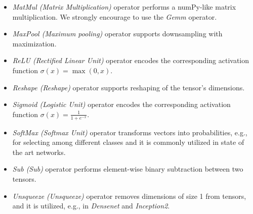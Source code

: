 \begin{itemize}
	\item \emph{MatMul (Matrix Multiplication)} operator performs a
		numPy-like matrix multiplication. We strongly encourage to use
		the \textit{Gemm} operator.
	  
	\item \emph{MaxPool (Maximum pooling)} operator supports
	  downsampling with maximization.
	
	\item \emph{ReLU (Rectified Linear Unit)} operator
	  encodes the corresponding activation function $\sigma(x) = \max(0, x)$.
	  
	\item \emph{Reshape (Reshape)} operator supports
	  reshaping of the tensor's dimensions.
	  
	\item \emph{Sigmoid (Logistic Unit)} operator
	  encodes the corresponding activation function $\sigma(x) =
	  \frac{1}{1 + e^{-x}}$.
	  
	\item \emph{SoftMax (Softmax Unit)} operator transforms
	  vectors into probabilities, e.g., for selecting among different
	  classes and it is commonly utilized in state of the art
	  networks.
	  
	\item \emph{Sub (Sub)} operator performs element-wise binary subtraction
		between two tensors.
	
	\item \emph{Unsqueeze (Unsqueeze)} operator removes dimensions of size
	  1 from tensors, and it is utilized, e.g., in \emph{Densenet} and
	  \emph{Inception2}.
\end{itemize}



